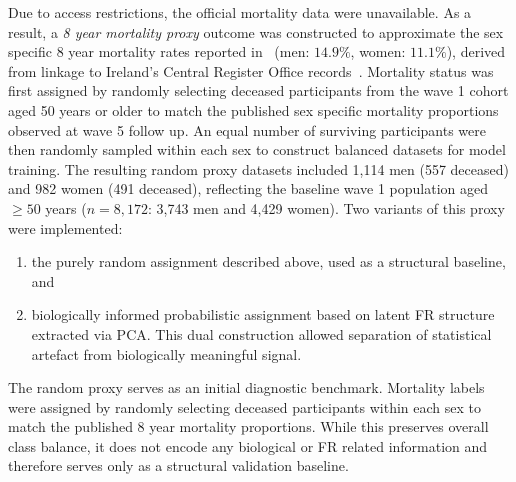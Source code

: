 Due to access restrictions, the official mortality data were unavailable. As a result, a \emph{8 year mortality proxy} outcome was constructed to approximate the sex specific 8 year mortality rates reported in~\cite{moguilnerImportanceAgePrediction2021} (men: $14.9\%$, women: $11.1\%$), derived from linkage to Ireland’s Central Register Office records~\cite{wardLinkingDeathRegistration2020a}. Mortality status was first assigned by randomly selecting deceased participants from the wave 1 cohort aged 50 years or older to match the published sex specific mortality proportions observed at wave 5 follow up. An equal number of surviving participants were then randomly sampled within each sex to construct balanced datasets for model training. The resulting random proxy datasets included 1,114 men (557 deceased) and 982 women (491 deceased), reflecting the baseline wave 1 population aged $\ge50$ years ($n = 8,172$: 3,743 men and 4,429 women). Two variants of this proxy were implemented:
\begin{enumerate}[label= (\roman*)]
\item the purely random assignment described above, used as a structural baseline, and 
\item biologically informed probabilistic assignment based on latent \gls{FR} structure extracted via \gls{PCA}. This dual construction allowed separation of statistical artefact from biologically meaningful signal. 
\end{enumerate} 

The random proxy serves as an initial diagnostic benchmark. Mortality labels were assigned by randomly selecting deceased participants within each sex to match the published 8 year mortality proportions. While this preserves overall class balance, it does not encode any biological or \gls{FR} related information and therefore serves only as a structural validation baseline.

